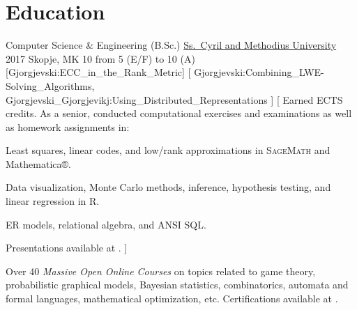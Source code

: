 \documentclass[11pt,letterpaper]{article}%
\begin{document}
\noindent%
\begin{minipage}[t]{.575\textwidth}
  \section{Education}%
  \label{sec:education}
  \EducationEntry%
  {Computer Science \& Engineering (B.Sc.)}%
  {\href{http://ukim.edu.mk/}{Ss.\ Cyril and Methodius University}}%
  {2017}%
  {Skopje, MK}%
  {10}%
  {from 5 (E/F) to 10 (A)}%
  [Gjorgjevski:ECC_in_the_Rank_Metric]%
  [%
  Gjorgjevski:Combining_LWE-Solving_Algorithms,%
  Gjorgjevski_Gjorgjevikj:Using_Distributed_Representations%
  ]%
  [%
  Earned  ECTS credits.  As a senior, conducted computational
  exercises and examinations as well as homework assignments in:
  \begin{description}%
    [leftmargin=*,widest=Linear Algebra,font=\normalfont\itshape]
  \item[Linear Algebra] Least squares, linear codes, and low\-/rank
    approximations in \textsc{SageMath} and Mathematica®.
  \item[Statistics] Data visualization, Monte Carlo methods, inference,
    hypothesis testing, and linear regression in R.
  \item[Databases] ER models, relational algebra, and ANSI SQL\@.
  \end{description}
  Presentations available at .%
  ]

  \begin{tcolorbox}[size=fbox,fontlower=\small,colframe=black]
    Over \num{40} \emph{Massive Open Online Courses} on topics related to game
    theory, probabilistic graphical models, Bayesian statistics, combinatorics,
    automata and formal languages, mathematical optimization, etc.%
    \tcblower%
    Certifications available at
    .
  \end{tcolorbox}

  \printbibliography[type=thesis,title=Theses,heading=bibnumbered]
  \printbibliography[nottype=thesis,title=Publications,heading=bibnumbered]%
\end{minipage}%
\hfill%
\noindent%
\end{document}
